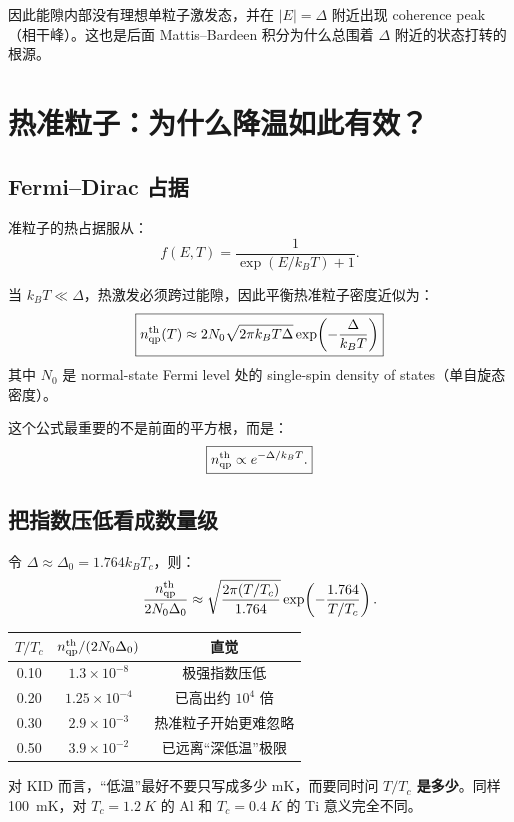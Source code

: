 \documentclass[11pt,a4paper,openany]{ctexrep}
\newcommand{\qp}{\mathrm{qp}}
\begin{document}
因此能隙内部没有理想单粒子激发态，并在 $|E|=\Delta$ 附近出现 coherence peak（相干峰）。这也是后面 Mattis--Bardeen 积分为什么总围着 $\Delta$ 附近的状态打转的根源。

\section{热准粒子：为什么降温如此有效？}

\subsection{Fermi--Dirac 占据}
准粒子的热占据服从：
\[
f(E,T)=\frac{1}{\exp(E/k_BT)+1}.
\]

当 $k_BT\ll\Delta$，热激发必须跨过能隙，因此平衡热准粒子密度近似为：
\[
\boxed{
n_{\qp}^{\rm th}(T)
\approx
2N_0\sqrt{2\pi k_BT\Delta}
\exp\!\left(-\frac{\Delta}{k_BT}\right)
}
\]
其中 $N_0$ 是 normal-state Fermi level 处的 single-spin density of states（单自旋态密度）。

这个公式最重要的不是前面的平方根，而是：
\[
\boxed{n_{\qp}^{\rm th}\propto e^{-\Delta/k_BT}.}
\]

\subsection{把指数压低看成数量级}
令 $\Delta\approx\Delta_0=1.764k_BT_c$，则：
\[
\frac{n_{\qp}^{\rm th}}{2N_0\Delta_0}
\approx
\sqrt{\frac{2\pi(T/T_c)}{1.764}}
\exp\!\left(-\frac{1.764}{T/T_c}\right).
\]

\begin{center}
\begin{tabular}{ccc}
\toprule
$T/T_c$ & $n_{\qp}^{\rm th}/(2N_0\Delta_0)$ & 直觉 \\
\midrule
0.10 & $1.3\times10^{-8}$ & 极强指数压低 \\
0.20 & $1.25\times10^{-4}$ & 已高出约 $10^4$ 倍 \\
0.30 & $2.9\times10^{-3}$ & 热准粒子开始更难忽略 \\
0.50 & $3.9\times10^{-2}$ & 已远离“深低温”极限 \\
\bottomrule
\end{tabular}
\end{center}

\begin{intuitionbox}
对 KID 而言，“低温”最好不要只写成多少 mK，而要同时问 \textbf{$T/T_c$ 是多少}。同样 \SI{100}{mK}，对 $T_c=\SI{1.2}{K}$ 的 Al 和 $T_c=\SI{0.4}{K}$ 的 Ti 意义完全不同。
\end{intuitionbox}
\end{document}
